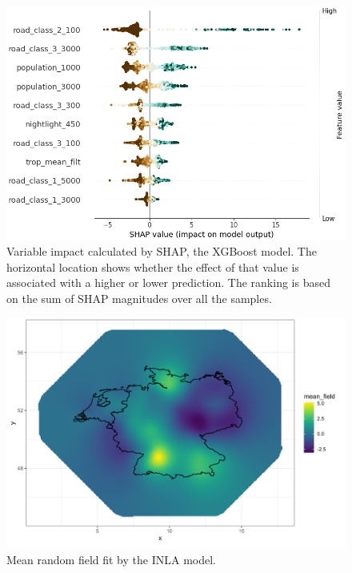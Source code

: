 \documentclass{article}
\begin{document}
\begin{figure}
\centering
\includegraphics[scale = 0.5]{fig/xgbshap.png}
\caption{Variable impact calculated by SHAP, the XGBoost model. The horizontal location shows whether the effect of that value is associated with a higher or lower prediction. The ranking is based on the sum of SHAP magnitudes over all the samples.}
\label{xgbshap}
\end{figure}


\begin{figure}
\centering
\includegraphics[scale = 0.5]{fig/mean_randomfield.png}
\caption{Mean random field fit by the INLA model.}
\label{randomfield}
\end{figure}
\end{document}

